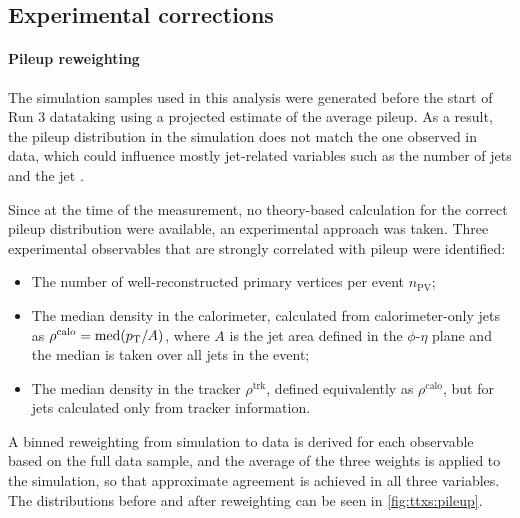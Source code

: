 \subsection{Experimental corrections}
\label{sec:ttxs:scalefactors}

\paragraph{Pileup reweighting}

The simulation samples used in this analysis were generated before the start of Run 3 datataking using a projected estimate of the average pileup. As a result, the pileup distribution in the simulation does not match the one observed in data, which could influence mostly jet-related variables such as the number of jets and the jet \pt.

Since at the time of the measurement, no theory-based calculation for the correct pileup distribution were available, an experimental approach was taken. Three experimental observables that are strongly correlated with pileup were identified: 

\begin{itemize}
    \item The number of well-reconstructed primary vertices per event $n_{\mathrm{PV}}$;
    \item The median \pt density in the calorimeter, calculated from calorimeter-only jets as $\rho^{\mathrm{calo}} = \mathrm{med} (p_{\mathrm{T}} / A)$, where $A$ is the jet area defined in the $\phi$-$\eta$ plane and the median is taken over all jets in the event;
    \item The median \pt density in the tracker $\rho^{\mathrm{trk}}$, defined equivalently as $\rho^{\mathrm{calo}}$, but for jets calculated only from tracker information.
\end{itemize}

A binned reweighting from simulation to data is derived for each observable based on the full data sample, and the average of the three weights is applied to the simulation, so that approximate agreement is achieved in all three variables. The distributions before and after reweighting can be seen in \cref{fig:ttxs:pileup}.

